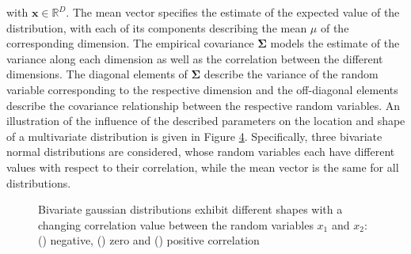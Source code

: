 \documentclass[../../../main.tex]{subfiles}
\begin{document}
with $\bm{x} \in \mathbb{R}^D$. The mean vector specifies the estimate of the expected value of the distribution, with each of its components describing the mean $\mu$ of the corresponding dimension. The empirical covariance $\bm{\Sigma}$ models the estimate of the variance along each dimension as well as the correlation between the different dimensions. The diagonal elements of $\bm{\Sigma}$ describe the variance of the random variable corresponding to the respective dimension and the off-diagonal elements describe the covariance relationship between the respective random variables. An illustration of the influence of the described parameters on the location and shape of a multivariate distribution is given in Figure \ref{fig:multiple_bivariate}. Specifically, three bivariate normal distributions are considered, whose random variables each have different values with respect to their correlation, while the mean vector is the same for all distributions.
 
\begin{figure}%
    \centering%
    \begin{subfigure}[b]{0.25\textwidth}%
        \centering\captionsetup{width=.8\linewidth}%
        \caption{}%
        \label{subfig:bivariate_neg}%
    \end{subfigure}%
    \begin{subfigure}[b]{0.33\textwidth}%
        \centering\captionsetup{width=.8\linewidth}%
        \caption{}%
        \label{subfig:bivariate_neutral}%
    \end{subfigure}%
    \begin{subfigure}[b]{0.33\textwidth}%
        \centering\captionsetup{width=.8\linewidth}%
        \caption{}%
        \label{subfig:bivariate_pos}%
    \end{subfigure}%
    \caption{Bivariate gaussian distributions exhibit different shapes with a changing correlation value between the random variables $x_1$ and $x_2$: () negative, () zero and () positive correlation}%
    \label{fig:multiple_bivariate}%
\end{figure}%
\end{document}
